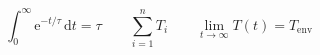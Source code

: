\[
    \int_0^\infty \mathrm{e}^{-t/\tau} \, \mathrm{d}t = \tau
    \qquad
    \sum_{i=1}^{n} T_i
    \qquad
    \lim_{t \to \infty} T(t) = T_{\mathrm{env}}
\]
